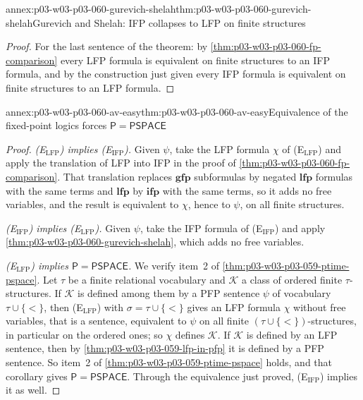 \begin{annexitem}{annex:p03-w03-p03-060-gurevich-shelah}{thm:p03-w03-p03-060-gurevich-shelah}{Gurevich and Shelah: IFP collapses to LFP on finite structures}
\begin{proof}
For the last sentence of the theorem: by
\cref{thm:p03-w03-p03-060-fp-comparison} every LFP formula is equivalent on
finite structures to an IFP formula, and by the construction just given
every IFP formula is equivalent on finite structures to an LFP formula.
\end{proof}
\end{annexitem}

\begin{annexitem}{annex:p03-w03-p03-060-av-easy}{thm:p03-w03-p03-060-av-easy}{Equivalence of the fixed-point logics forces \(\mathsf P=\mathsf{PSPACE}\)}
\begin{proof}
\emph{(E\(_{\mathrm{LFP}}\)) implies (E\(_{\mathrm{IFP}}\)).} Given
\(\psi\), take the LFP formula \(\chi\) of (E\(_{\mathrm{LFP}}\)) and apply
the translation of LFP into IFP in the proof of
\cref{thm:p03-w03-p03-060-fp-comparison}. That translation replaces
\(\mathbf{gfp}\) subformulas by negated \(\mathbf{lfp}\) formulas with the
same terms and \(\mathbf{lfp}\) by \(\mathbf{ifp}\) with the same terms, so
it adds no free variables, and the result is equivalent to \(\chi\), hence
to \(\psi\), on all finite structures.

\emph{(E\(_{\mathrm{IFP}}\)) implies (E\(_{\mathrm{LFP}}\)).} Given
\(\psi\), take the IFP formula of (E\(_{\mathrm{IFP}}\)) and apply
\cref{thm:p03-w03-p03-060-gurevich-shelah}, which adds no free variables.

\emph{(E\(_{\mathrm{LFP}}\)) implies \(\mathsf P=\mathsf{PSPACE}\).} We
verify item~2 of \cref{thm:p03-w03-p03-059-ptime-pspace}. Let \(\tau\) be a
finite relational vocabulary and \(\mathcal K\) a class of ordered finite
\(\tau\)-structures. If \(\mathcal K\) is defined among them by a PFP
sentence \(\psi\) of vocabulary \(\tau\cup\{<\}\), then
(E\(_{\mathrm{LFP}}\)) with \(\sigma=\tau\cup\{<\}\) gives an LFP formula
\(\chi\) without free variables, that is a sentence, equivalent to
\(\psi\) on all finite \((\tau\cup\{<\})\)-structures, in particular on the
ordered ones; so \(\chi\) defines \(\mathcal K\). If \(\mathcal K\) is
defined by an LFP sentence, then by \cref{thm:p03-w03-p03-059-lfp-in-pfp}
it is defined by a PFP sentence. So item~2 of
\cref{thm:p03-w03-p03-059-ptime-pspace} holds, and that corollary gives
\(\mathsf P=\mathsf{PSPACE}\). Through the equivalence just proved,
(E\(_{\mathrm{IFP}}\)) implies it as well.
\end{proof}
\end{annexitem}
